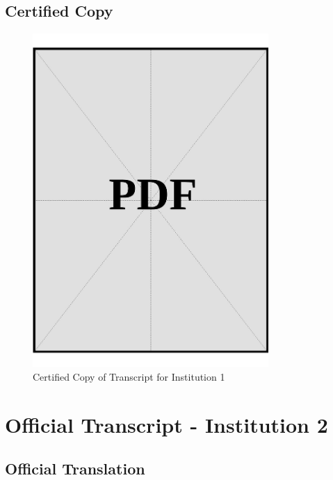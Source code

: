 \clearpage

\subsection*{Certified Copy}
\vspace*{\fill}

\begin{figure}[h]
    \centering
    \includegraphics[page=1, width=0.8\textwidth]{../docs/applicant/post-secondary-institutions/institution-1/transcript/certified-copies.pdf}
    \caption{Certified Copy of Transcript for Institution 1}
    \label{fig:institution-1-transcript-certified-copy}
\end{figure}

\vspace*{\fill}
\clearpage


\section{Official Transcript - Institution 2}\label{sec:institution-2-transcript}

\subsection*{Official Translation}
\vspace*{\fill}

